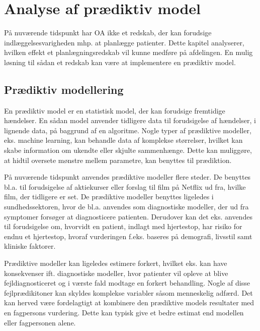 \chapter{Analyse af prædiktiv model}
På nuværende tidspunkt har OA ikke et redskab, der kan forudsige indlæggelsesvarigheden mhp. at planlægge patienter. Dette kapitel analyserer, hvilken effekt et planlægningsredskab vil kunne medføre  på afdelingen. En mulig løsning til sådan et redskab kan være at implementere en prædiktiv model. 


\section{Prædiktiv modellering} \label{praemodel}
En prædiktiv model er en statistisk model, der kan forudsige fremtidige hændelser. En sådan model anvender tidligere data til forudsigelse af hændelser, i lignende data, på baggrund af en algoritme. Nogle typer af prædiktive modeller, eks. machine learning, kan behandle data af komplekse størrelser, hvilket kan skabe information om ukendte eller skjulte sammenhænge. Dette kan muliggøre, at hidtil oversete mønstre mellem parametre, kan benyttes til prædiktion.\cite{Kuhn2013}

På nuværende tidspunkt anvendes prædiktive modeller flere steder. De benyttes bl.a. til forudsigelse af aktiekurser eller forslag til film på Netflix ud fra, hvilke film, der tidligere er set.\cite{DIKU2012}
De prædiktive modeller benyttes ligeledes i sundhedssektoren, hvor de bl.a. anvendes som diagnostiske modeller, der ud fra symptomer forsøger at diagnosticere patienten.\cite{Kuhn2013} Derudover kan det eks. anvendes til forudsigelse om, hvorvidt en patient, indlagt med hjertestop, har risiko for endnu et hjertestop, hvoraf vurderingen f.eks. baseres på demografi, livsstil samt kliniske faktorer\cite{Hastie2008}. 

Prædiktive modeller kan ligeledes estimere forkert, hvilket eks. kan have konsekvenser ift. diagnostiske modeller, hvor patienter vil opleve at blive fejldiagnosticeret og i værste fald modtage en forkert behandling. Nogle af disse fejlprædikitoner kan skyldes komplekse variabler såsom menneskelig adfærd. Det kan herved være fordelagtigt at kombinere den prædiktive models resultater med en fagpersons vurdering. Dette kan typisk give et bedre estimat end modellen eller fagpersonen alene.\cite{Kuhn2013} 

